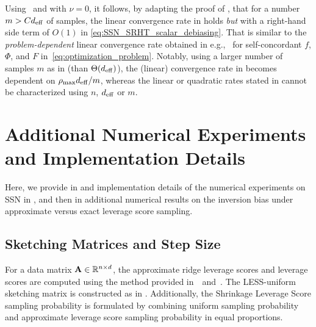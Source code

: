 \documentclass[11pt,a4paper]{article}
\begin{document}
\begin{remark}\normalfont \label{rem:ssn_srht_scalar}
Using~ and  with $\nu = 0$, it follows, by adapting the proof of , that for a number $m>Cd_{\mathrm{eff}}$ of samples, the linear convergence rate in  holds \emph{but} with a right-hand side term of $O(1)$ in \eqref{eq:SSN_SRHT_scalar_debiasing}. 
That is similar to the \emph{problem-dependent} linear convergence rate obtained in e.g.,~\citet[Theorem 2]{lacotte2021adaptive} for self-concordant $f$, $\Phi$, and $F$ in~\eqref{eq:optimization_problem}. 
Notably, using a larger number of samples $m$ as in  (than $\Theta(d_{\mathrm{eff}})$), the (linear) convergence rate in  becomes dependent on $\rho_{\max} d_{\mathrm{eff}}/m$, whereas the linear or quadratic rates stated in \citet[Theorem 2]{lacotte2021adaptive} cannot be characterized using $n$, $d_{\mathrm{eff}}$ or $m$.
\end{remark}

\section{Additional Numerical Experiments and Implementation Details}
\label{sec:imple_detail_nmerical_exper}



Here, we provide in  and  implementation details of the numerical experiments on SSN in , and then in  additional numerical results on the inversion bias under approximate versus exact leverage score sampling.



\subsection{Sketching Matrices and Step Size}
\label{sec:sketch_matrix}

For a data matrix $\mathbf{A}\in{\mathbb{R}}^{n\times d}$, the approximate ridge leverage scores and  leverage scores are computed using the method provided in~\citet{drineas2012fast}~and~\citet{cohen2017input}. 
The LESS-uniform sketching matrix  is constructed as in \citet[Section~E.1]{derezinski2021newtonless}. 
Additionally, the Shrinkage Leverage Score sampling probability is formulated by combining uniform sampling probability and approximate leverage score sampling probability in equal proportions. 
\end{document}
